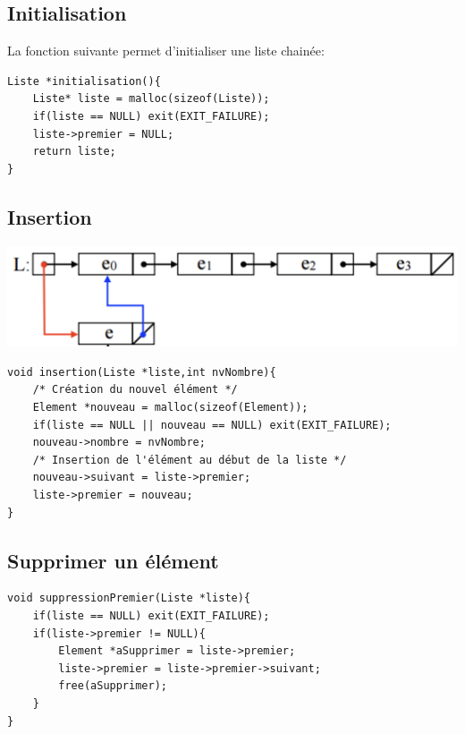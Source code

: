 \documentclass[a4paper]{article}
\begin{document}
\subsection{Initialisation}
La fonction suivante permet d'initialiser une liste chainée:

\begin{verbatim}
Liste *initialisation(){
    Liste* liste = malloc(sizeof(Liste));
    if(liste == NULL) exit(EXIT_FAILURE);
    liste->premier = NULL;
    return liste;
}
\end{verbatim}



\subsection{Insertion}
\begin{center}
\includegraphics[scale=0.25]{liste02.png} 
\end{center}  
\begin{verbatim}
void insertion(Liste *liste,int nvNombre){
    /* Création du nouvel élément */
    Element *nouveau = malloc(sizeof(Element));
    if(liste == NULL || nouveau == NULL) exit(EXIT_FAILURE);
    nouveau->nombre = nvNombre;
    /* Insertion de l'élément au début de la liste */
    nouveau->suivant = liste->premier;
    liste->premier = nouveau;
}
\end{verbatim}

\subsection{Supprimer un élément}
\begin{verbatim}
void suppressionPremier(Liste *liste){
    if(liste == NULL) exit(EXIT_FAILURE);
    if(liste->premier != NULL){
        Element *aSupprimer = liste->premier;
        liste->premier = liste->premier->suivant;
        free(aSupprimer);
    }
}
\end{verbatim}
\end{document}
